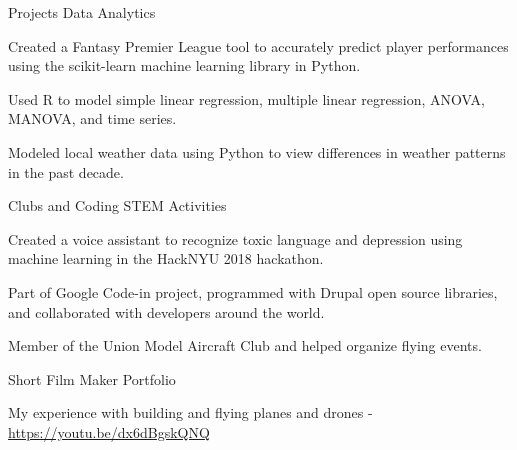 \begin{cventries}
  \cventry
    {Projects}
    {Data Analytics}
    {}
    {}
    {
      \begin{cvitems}
        \item {Created a Fantasy Premier League tool to accurately predict player performances using the scikit-learn machine learning library in Python.}
        \item {Used R to model simple linear regression, multiple linear regression, ANOVA, MANOVA, and time series.}
        \item {Modeled local weather data using Python to view differences in weather patterns in the past decade.}
      \end{cvitems}
    }
  \cventry
    {Clubs and Coding}
    {STEM Activities}
    {}
    {}
    {
      \begin{cvitems}
        \item {Created a voice assistant to recognize toxic language and depression using machine learning in the HackNYU 2018 hackathon.}
        \item {Part of Google Code-in project, programmed with Drupal open source libraries, and collaborated with developers around the world.}
        \item {Member of the Union Model Aircraft Club and helped organize flying events.}
      \end{cvitems}
    }
  \cventry
    {Short Film}
    {Maker Portfolio}
    {}
    {}
    {
      \begin{cvitems}
        \item {My experience with building and flying planes and drones - \href{https://youtu.be/dx6dBgskQNQ}{https://youtu.be/dx6dBgskQNQ}}
      \end{cvitems}
    }
\end{cventries}
